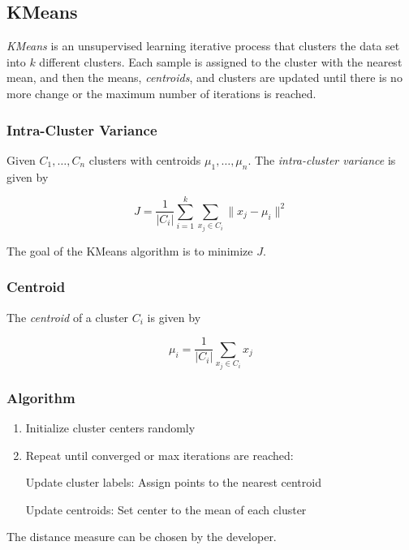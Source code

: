 \subsection{KMeans}

\emph{KMeans} is an unsupervised learning iterative process that clusters the data set into \(k\) different clusters.
Each sample is assigned to the cluster with the nearest mean, and then the means, \emph{centroids}, and clusters are 
updated until there is no more change or the maximum number of iterations is reached.

\subsubsection{Intra-Cluster Variance}

Given \(C_1, \dots, C_n\) clusters with centroids \(\mu_1, \dots, \mu_n\). The \emph{intra-cluster variance} is given by

\[
    J = \frac{1}{|C_i|} \sum_{i = 1}^{k} \sum_{x_j \in C_i} \| x_j - \mu_i \|^2
\]

The goal of the KMeans algorithm is to minimize \(J\).

\subsubsection{Centroid}

The \emph{centroid} of a cluster \(C_i\) is given by

\[
    \mu_i = \frac{1}{|C_i|} \sum_{x_j \in C_i} x_j
\]

\subsubsection*{Algorithm}

\begin{enumerate}

    \item Initialize cluster centers randomly 

    \item Repeat until converged or max iterations are reached: 

        \subitem Update cluster labels: Assign points to the nearest centroid 

        \subitem Update centroids: Set center to the mean of each cluster

\end{enumerate}

The distance measure can be chosen by the developer.

